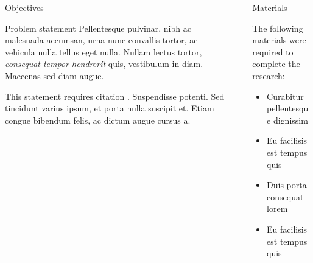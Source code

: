 \documentclass[]{beamer}
\begin{document}
\begin{frame}[t]
\begin{columns}[t]
\begin{column}{\onecolwid}
\begin{alertblock}{Objectives}
    \end{alertblock}
    
    \begin{block}{Problem statement}
    Pellentesque pulvinar, nibh ac malesuada accumsan, urna nunc convallis tortor, ac vehicula nulla tellus eget nulla.
    Nullam lectus tortor, \textit{consequat tempor hendrerit} quis, vestibulum in diam. Maecenas sed diam augue.
    
    This statement requires citation \cite{Heston1993}.
    Suspendisse potenti. Sed tincidunt varius ipsum, et porta nulla suscipit et. Etiam congue bibendum felis, 
    ac dictum augue cursus a.
    \end{block}
    
    
    \end{column} %
    
    \begin{column}{\sepwid}\end{column} %
    
    \begin{column}{\twocolwid} %
    
    \begin{columns}[t,totalwidth=\twocolwid] %
    
    \begin{column}{\onecolwid}\vspace{-.6in} %
    
    
    \begin{block}{Materials}
    
    The following materials were required to complete the research:
    
    \begin{itemize}
    \item Curabitur pellentesque dignissim
    \item Eu facilisis est tempus quis
    \item Duis porta consequat lorem
    \item Eu facilisis est tempus quis
    \end{itemize}
    

\end{block}
\end{column}
\end{columns}
\end{column}
\end{columns}
\end{frame}
\end{document}
